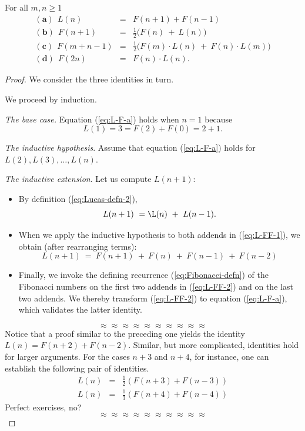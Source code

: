 \begin{prop}
\label{thm:Lucas-n:2Fibs}
For all $m, n \geq 1$
\begin{eqnarray}
\label{eq:L-F-a}
\mathbf{(a) } \ \ 
L(n) & = & F(n+1) + F(n-1) \\
\label{eq:L-F-b}
\mathbf{(b) } \ \
F(n+1) & = & \frac{1}{2} \big(F(n) \ + \ L(n) \big) \\
\label{eq:L-F-c}
\mathbf{(c) } \ \
F(m + n-1) & = & \frac{1}{2} \big( F(m) \cdot L(n) \ + \ F(n) \cdot L(m) \big) \\
\label{eq:L-F-d}
\mathbf{(d) } \ \
F(2n) & = & F(n) \cdot L(n).
\end{eqnarray}
\end{prop}

\begin{proof}
We consider the three identities in turn.

We proceed by induction.

\medskip

\noindent
{\it The base case.}
Equation (\ref{eq:L-F-a}) holds when $n=1$ because
\[ L(1) = 3 = F(2) + F(0) = 2+1. \]

\medskip

\noindent
{\it The inductive hypothesis}.
Assume that equation (\ref{eq:L-F-a}) holds for $L(2), L(3), \ldots,
L(n)$.

\medskip

\noindent
{\it The inductive extension}. 
Let us compute $L(n+1)$:
\begin{itemize}
\item
By definition (\ref{eq:Lucas-defn-2}),
\begin{equation}
\label{eq:L-FF-1}
L(n+1) \ = \L(n) \ + \ L(n-1).
\end{equation}
\item
When we apply the inductive hypothesis to both addends in
(\ref{eq:L-FF-1}), we obtain (after rearranging terms):
\begin{equation}
\label{eq:L-FF-2}
L(n+1) \ = \  F(n+1) \ + \ F(n) \ + \ F(n-1) \ + \ F(n-2)
\end{equation}
\item
Finally, we invoke the defining recurrence (\ref{eq:Fibonacci-defn})
of the Fibonacci numbers on the first two addends in (\ref{eq:L-FF-2})
and on the last two addends.  We thereby transform (\ref{eq:L-FF-2})
to equation (\ref{eq:L-F-a}), which validates the latter identity.
\end{itemize}

\[ \approx \approx \approx \approx \approx \approx \approx \approx \approx \approx \]
Notice that a proof similar to the preceding one yields the identity
$L(n) = F(n+2) + F(n-2)$.  Similar, but more complicated, identities
hold for larger arguments.  For the cases $n+3$ and $n+4$, for
instance, one can establish the following pair of identities.
\begin{eqnarray}
\label{eq:LF:n+3}
L(n) & = & \frac{1}{2} (F(n+3)+F(n-3)) \\
\label{eq:LF:n+4}
L(n) & = & \frac{1}{3} (F(n+4)+F(n-4))
\end{eqnarray}
{\Arny Perfect exercises, no?}
\[ \approx \approx \approx \approx \approx \approx \approx \approx \approx \approx \]


\end{proof}
